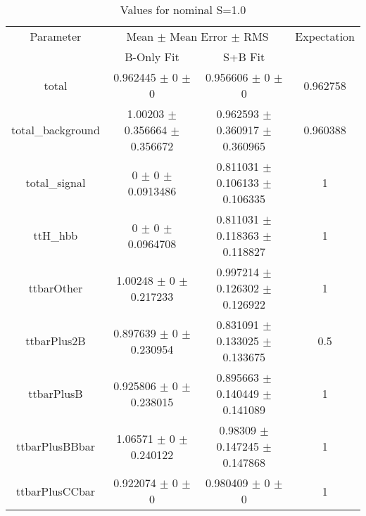 \begin{table}
\centering
\caption{Values for nominal S=1.0}
\begin{tabular}{cccc}
\toprule
Parameter & \multicolumn{2}{c}{Mean $\pm$ Mean Error $\pm$ RMS} & Expectation\\
 & B-Only Fit & S+B Fit & \\
\midrule
total & \num{0.962445} $\pm$ \num{0} $\pm$ \num{0} & \num{0.956606} $\pm$ \num{0} $\pm$ \num{0} & \num{0.962758}\\
total\_background & \num{1.00203} $\pm$ \num{0.356664} $\pm$ \num{0.356672} & \num{0.962593} $\pm$ \num{0.360917} $\pm$ \num{0.360965} & \num{0.960388}\\
total\_signal & \num{0} $\pm$ \num{0} $\pm$ \num{0.0913486} & \num{0.811031} $\pm$ \num{0.106133} $\pm$ \num{0.106335} & \num{1}\\
ttH\_hbb & \num{0} $\pm$ \num{0} $\pm$ \num{0.0964708} & \num{0.811031} $\pm$ \num{0.118363} $\pm$ \num{0.118827} & \num{1}\\
ttbarOther & \num{1.00248} $\pm$ \num{0} $\pm$ \num{0.217233} & \num{0.997214} $\pm$ \num{0.126302} $\pm$ \num{0.126922} & \num{1}\\
ttbarPlus2B & \num{0.897639} $\pm$ \num{0} $\pm$ \num{0.230954} & \num{0.831091} $\pm$ \num{0.133025} $\pm$ \num{0.133675} & \num{0.5}\\
ttbarPlusB & \num{0.925806} $\pm$ \num{0} $\pm$ \num{0.238015} & \num{0.895663} $\pm$ \num{0.140449} $\pm$ \num{0.141089} & \num{1}\\
ttbarPlusBBbar & \num{1.06571} $\pm$ \num{0} $\pm$ \num{0.240122} & \num{0.98309} $\pm$ \num{0.147245} $\pm$ \num{0.147868} & \num{1}\\
ttbarPlusCCbar & \num{0.922074} $\pm$ \num{0} $\pm$ \num{0} & \num{0.980409} $\pm$ \num{0} $\pm$ \num{0} & \num{1}\\
\bottomrule
\end{tabular}
\end{table}